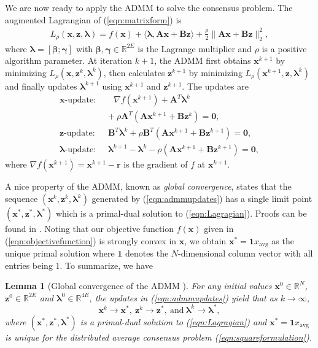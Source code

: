 \documentclass[journal]{IEEEtran}
\newtheorem{lemma}{Lemma}
\begin{document}
We are now ready to apply the ADMM to solve the consensus problem. The augmented Lagrangian of (\ref{eqn:matrixform}) is 
\begin{equation}
\label{eqn:Lagragian}
\begin{aligned}
L_\rho(\bm x,\bm z,\bm \lambda)=f(\bm x)+\langle \bm \lambda,\bm{Ax}+\bm{Bz}\rangle+\frac{\rho}{2}\|\bm{Ax}+\bm{Bz}\|_2^2,
\end{aligned}
\end{equation}
where $\bm \lambda=[\bm \beta; \bm \gamma]$ with $\bm \beta,\bm \gamma\in\mathbb{R}^{2E}$ is the Lagrange multiplier and $\rho$ is a positive algorithm parameter. At iteration $k+1$, the ADMM first obtains $\bm x^{k+1}$ by minimizing $L_\rho(\bm x,\bm z^k,\bm \lambda^k)$, then calculates $\bm z^{k+1}$ by minimizing $L_\rho(\bm x^{k+1},\bm z,\bm \lambda^k)$ and finally updates $\bm \lambda^{k+1}$ using $\bm x^{k+1}$ and $\bm z^{k+1}$. The updates are 
\begin{equation}
\label{eqn:admmupdates}
\begin{aligned}
\bm x\text{-update}:&~~~~~\nabla f(\bm x^{k+1}) + \bm A^T\bm\lambda^k\\&~+\rho \bm A^T(\bm A\bm x^{k+1}+\bm B\bm z^k)=\bm 0,\\
\bm z\text{-update}:&~~\bm B^T\bm \lambda^k+\rho \bm B^T(\bm A\bm x^{k+1}+\bm B\bm z^{k+1}) = \bm 0,\\
\bm \lambda\text{-update}:&~~\bm \lambda^{k+1}-\bm\lambda^k-\rho(\bm A\bm x^{k+1}+\bm B\bm z^{k+1})=\bm 0,
\end{aligned}
\end{equation} 
where $\nabla f(\bm x^{k+1})=\bm x^{k+1}-\bm r$ is the gradient of $f$ at $\bm x^{k+1}$. 

A nice property of the ADMM, known as \emph{global convergence}, states that the sequence $(\bm x^k,\bm z^k,\bm \lambda^k)$ generated by (\ref{eqn:admmupdates}) has a single limit point  $(\bm x^*,\bm z^*,\bm \lambda^*)$ which is a primal-dual solution to (\ref{eqn:Lagragian}). Proofs can be found in \cite{BoydADMM,Deng2016,He2012}. Noting that our objective function $f(\bm x)$ given in (\ref{eqn:objectivefunction}) is strongly convex in $\bm x$, we obtain $\bm x^*=\bm 1x_\text{avg}$ as the unique primal solution where $\bm 1$ denotes the $N$-dimensional column vector with all entries being $1$. To summarize, we have
\begin{lemma}[Global convergence of the ADMM \cite{BoydADMM,Deng2016,He2012}]
\label{lem:globalconvergence}
For any initial values $\bm x^0\in\mathbb{R}^N$, $\bm z^0\in\mathbb{R}^{2E}$ and $\bm \lambda^0\in\mathbb{R}^{4E}$, the updates in (\ref{eqn:admmupdates}) yield that as $k\to\infty$, $$\bm x^k\to \bm x^*, ~\bm z^k\to\bm z^*,~\text{and}~\bm \lambda^k\to\bm \lambda^*,$$
where $(\bm x^*,\bm z^*,\bm \lambda^*)$ is a primal-dual solution to (\ref{eqn:Lagragian}) and $\bm x^*=\bm 1x_\text{avg}$ is unique for the distributed average consensus problem (\ref{eqn:squareformulation}).
\end{lemma}
\end{document}
